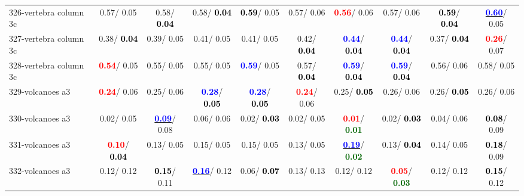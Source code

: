 \begin{table}[h]
\begin{center}
{\begin{tabular}{lc|c|c|c|c|c|c|c|c}
326-vertebra column 3c &   0.57/  0.05 &   0.58/\textcolor{black}{\textbf{  0.04}} &   0.58/\textcolor{black}{\textbf{  0.04}} & \textcolor{black}{\textbf{  0.59}}/  0.05 &   0.57/  0.06 & \textcolor{red}{\textbf{  0.56}}/  0.06 &   0.57/  0.06 & \textcolor{black}{\textbf{  0.59}}/\textcolor{black}{\textbf{  0.04}} & \underline{\textcolor{blue}{\textbf{  0.60}}}/  0.05 \\
327-vertebra column 3c &   0.38/\textcolor{black}{\textbf{  0.04}} &   0.39/  0.05 &   0.41/  0.05 &   0.41/  0.05 &   0.42/\textcolor{black}{\textbf{  0.04}} & \textcolor{blue}{\textbf{  0.44}}/\textcolor{black}{\textbf{  0.04}} & \textcolor{blue}{\textbf{  0.44}}/\textcolor{black}{\textbf{  0.04}} &   0.37/\textcolor{black}{\textbf{  0.04}} & \textcolor{red}{\textbf{  0.26}}/  0.07 \\ \hline
328-vertebra column 3c & \textcolor{red}{\textbf{  0.54}}/  0.05 &   0.55/  0.05 &   0.55/  0.05 & \textcolor{blue}{\textbf{  0.59}}/  0.05 &   0.57/\textcolor{black}{\textbf{  0.04}} & \textcolor{blue}{\textbf{  0.59}}/\textcolor{black}{\textbf{  0.04}} & \textcolor{blue}{\textbf{  0.59}}/\textcolor{black}{\textbf{  0.04}} &   0.56/  0.06 &   0.58/  0.05 \\
329-volcanoes a3 & \textcolor{red}{\textbf{  0.24}}/  0.06 &   0.25/  0.06 & \textcolor{blue}{\textbf{  0.28}}/\textcolor{black}{\textbf{  0.05}} & \textcolor{blue}{\textbf{  0.28}}/\textcolor{black}{\textbf{  0.05}} & \textcolor{red}{\textbf{  0.24}}/  0.06 &   0.25/\textcolor{black}{\textbf{  0.05}} &   0.26/  0.06 &   0.26/\textcolor{black}{\textbf{  0.05}} &   0.26/  0.06 \\
330-volcanoes a3 &   0.02/  0.05 & \underline{\textcolor{blue}{\textbf{  0.09}}}/  0.08 &   0.06/  0.06 &   0.02/\textcolor{black}{\textbf{  0.03}} &   0.02/  0.05 & \textcolor{red}{\textbf{  0.01}}/\textcolor{darkgreen}{\textbf{  0.01}} &   0.02/\textcolor{black}{\textbf{  0.03}} &   0.04/  0.06 & \textcolor{black}{\textbf{  0.08}}/  0.09 \\
331-volcanoes a3 & \textcolor{red}{\textbf{  0.10}}/\textcolor{black}{\textbf{  0.04}} &   0.13/  0.05 &   0.15/  0.05 &   0.15/  0.05 &   0.13/  0.05 & \underline{\textcolor{blue}{\textbf{  0.19}}}/\textcolor{darkgreen}{\textbf{  0.02}} &   0.13/\textcolor{black}{\textbf{  0.04}} &   0.14/  0.05 & \textcolor{black}{\textbf{  0.18}}/  0.09 \\
332-volcanoes a3 &   0.12/  0.12 & \textcolor{black}{\textbf{  0.15}}/  0.11 & \underline{\textcolor{blue}{\textbf{  0.16}}}/  0.12 &   0.06/\textcolor{black}{\textbf{  0.07}} &   0.13/  0.13 &   0.12/  0.12 & \textcolor{red}{\textbf{  0.05}}/\textcolor{darkgreen}{\textbf{  0.03}} &   0.12/  0.12 & \textcolor{black}{\textbf{  0.15}}/  0.12 \\

\end{tabular}}
\end{center}
\end{table}
